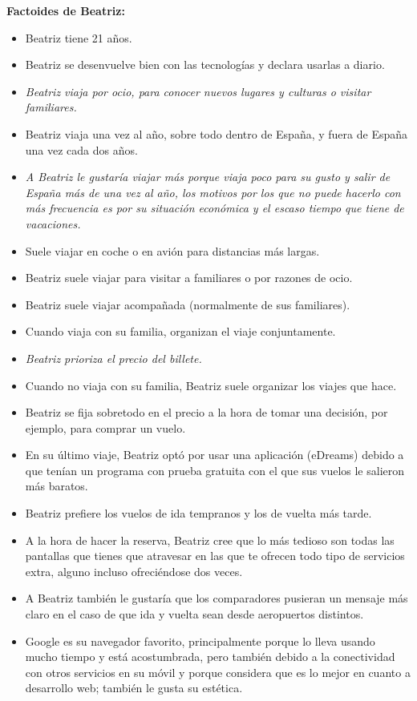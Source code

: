 \textbf{Factoides de Beatriz:}
\begin{itemize}
    \item Beatriz tiene 21 años.
    \item Beatriz se desenvuelve bien con las tecnologías y declara usarlas a diario.
    \item \textit{Beatriz viaja por ocio, para conocer nuevos lugares y culturas o visitar familiares.}
    \item Beatriz viaja una vez al año, sobre todo dentro de España, y fuera de España una vez cada dos años.
    \item \textit{A Beatriz le gustaría viajar más porque viaja poco para su gusto y salir de España más de una vez al año, los motivos por los que no puede hacerlo con más frecuencia es por su situación económica y el escaso tiempo que tiene de vacaciones.}
    \item Suele viajar en coche o en avión para distancias más largas.
    \item Beatriz suele viajar para visitar a familiares o por razones de ocio.
    \item Beatriz suele viajar acompañada (normalmente de sus familiares).
    \item Cuando viaja con su familia, organizan el viaje conjuntamente.
    \item \textit{Beatriz prioriza el precio del billete.}
    \item Cuando no viaja con su familia, Beatriz suele organizar los viajes que hace.
    \item Beatriz se fija sobretodo en el precio a la hora de tomar una decisión, por ejemplo, para comprar un vuelo.
    \item En su último viaje, Beatriz optó por usar una aplicación (eDreams) debido a que tenían un programa con prueba gratuita con el que sus vuelos le salieron más baratos.
    \item Beatriz prefiere los vuelos de ida tempranos y los de vuelta más tarde.
    \item A la hora de hacer la reserva, Beatriz cree que lo más tedioso son todas las pantallas que tienes que atravesar en las que te ofrecen todo tipo de servicios extra, alguno incluso ofreciéndose dos veces.
    \item A Beatriz también le gustaría que los comparadores pusieran un mensaje más claro en el caso de que ida y vuelta sean desde aeropuertos distintos.
    \item Google es su navegador favorito, principalmente porque lo lleva usando mucho tiempo y está acostumbrada, pero también debido a la conectividad con otros servicios en su móvil y porque considera que es lo mejor en cuanto a desarrollo web; también le gusta su estética.

\end{itemize}
